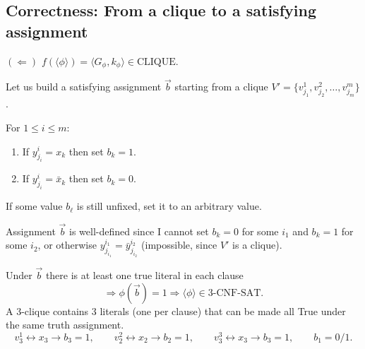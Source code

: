 \subsection{Correctness: From a clique to a satisfying assignment}
$(\Leftarrow)$ $f(\langle\phi\rangle)=\langle G_\phi,k_\phi\rangle\in\mathrm{CLIQUE}$.

Let us build a satisfying assignment $\vec b$ starting from a clique $V'=\{v_{j_1}^1,v_{j_2}^2,\ldots,v_{j_m}^m\}$.

For $1\leq i\leq m$:
\begin{enumerate}
\item If $y_{j_i}^i=x_k$ then set $b_k=1$.
\item If $y_{j_i}^i=\bar x_k$ then set $b_k=0$.
\end{enumerate}
If some value $b_\ell$ is still unfixed, set it to an arbitrary value.

Assignment $\vec b$ is well-defined since I cannot set $b_k=0$ for some $i_1$ and $b_k=1$ for some $i_2$, or otherwise $y_{j_{i_1}}^{i_1}=\bar y_{j_{i_2}}^{i_2}$ (impossible, since $V'$ is a clique).

Under $\vec b$ there is at least one true literal in each clause
\[\Rightarrow\phi(\vec b)=1\Rightarrow\langle\phi\rangle\in\mathrm{3\text{-}CNF\text{-}SAT}.\]
A 3-clique contains 3 literals (one per clause) that can be made all True under the same truth assignment.
\[
v_3^1\leftrightarrow x_3\longrightarrow b_3=1,\qquad
v_2^2\leftrightarrow x_2\longrightarrow b_2=1,\qquad
v_3^3\leftrightarrow x_3\longrightarrow b_3=1,\qquad b_1=0/1.
\]
